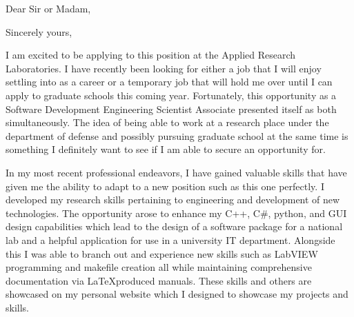 \documentclass[10pt,a4paper,sans]{moderncv} %
\begin{document}
\makecvtitle 



\date{\today} %
\opening{Dear Sir or Madam,} %

\closing{Sincerely yours,} %

\makelettertitle %

\hspace{1cm}I am excited to be applying to this position at the Applied Research Laboratories. I have recently been looking for either a job that I will enjoy settling into as a career or a temporary job that will hold me over until I can apply to graduate schools this coming year. Fortunately, this opportunity as a Software Development Engineering Scientist Associate presented itself as both simultaneously. The idea of being able to work at a research place under the department of defense and possibly pursuing graduate school at the same time is something I definitely want to see if I am able to secure an opportunity for.

\hspace{1cm}In my most recent professional endeavors, I have gained valuable skills that have given me the ability to adapt to a new position such as this one perfectly. I developed my research skills pertaining to engineering and development of new technologies. The opportunity arose to enhance my C++, C\#, python, and GUI design capabilities which lead to the design of a software package for a national lab and a helpful application for use in a university IT department. Alongside this I was able to branch out and experience new skills such as LabVIEW programming and makefile creation all while maintaining comprehensive documentation via \LaTeX produced manuals. These skills and others are showcased on my personal website which I designed to showcase my projects and skills.
\end{document}

